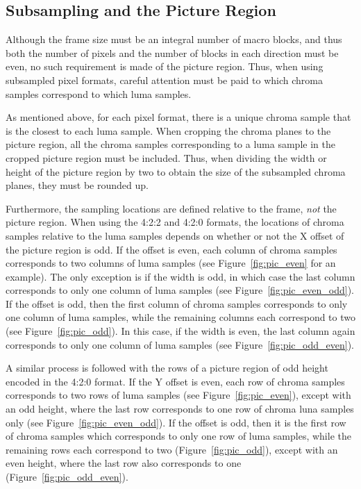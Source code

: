 \documentclass[9pt,letterpaper]{book}
\numberwithin{equation}{chapter}
\numberwithin{figure}{chapter}
\numberwithin{table}{chapter}
\begin{document}
\subsection{Subsampling and the Picture Region}

Although the frame size must be an integral number of macro blocks, and thus
 both the number of pixels and the number of blocks in each direction must be
 even, no such requirement is made of the picture region.
Thus, when using subsampled pixel formats, careful attention must be paid to
 which chroma samples correspond to which luma samples.

As mentioned above, for each pixel format, there is a unique chroma sample that
 is the closest to each luma sample.
When cropping the chroma planes to the picture region, all the chroma samples
 corresponding to a luma sample in the cropped picture region must be included.
Thus, when dividing the width or height of the picture region by two to obtain
 the size of the subsampled chroma planes, they must be rounded up.

Furthermore, the sampling locations are defined relative to the frame,
 {\em not} the picture region.
When using the 4:2:2 and 4:2:0 formats, the locations of chroma samples
 relative to the luma samples depends on whether or not the X offset of the
 picture region is odd.
If the offset is even, each column of chroma samples corresponds to two columns
 of luma samples (see Figure~\ref{fig:pic_even} for an example).
The only exception is if the width is odd, in which case the last column
 corresponds to only one column of luma samples (see Figure~\ref{fig:pic_even_odd}).
If the offset is odd, then the first column of chroma samples corresponds to
 only one column of luma samples, while the remaining columns each correspond
 to two (see Figure~\ref{fig:pic_odd}).
In this case, if the width is even, the last column again corresponds to only
 one column of luma samples (see Figure~\ref{fig:pic_odd_even}).

A similar process is followed with the rows of a picture region of odd height
 encoded in the 4:2:0 format.
If the Y offset is even, each row of chroma samples corresponds to two rows of
 luma samples (see Figure~\ref{fig:pic_even}), except with an odd height, where
 the last row corresponds to one row of chroma luna samples only (see 
 Figure~\ref{fig:pic_even_odd}).
If the offset is odd, then it is the first row of chroma samples which
 corresponds to only one row of luma samples, while the remaining rows each
 correspond to two (Figure~\ref{fig:pic_odd}), except with an even height, 
 where the last row also corresponds to one (Figure~\ref{fig:pic_odd_even}).
\end{document}
